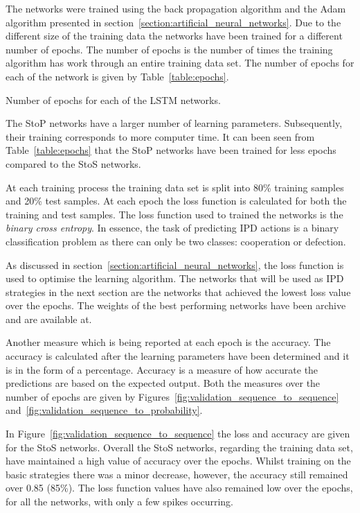 The networks were trained using the back propagation algorithm
and the Adam algorithm presented in
section~\ref{section:artificial_neural_networks}.
Due to the different size of the training data the networks have been trained
for a different number of epochs. The number of epochs is the number of times
the training algorithm has work through an entire training data set. The number
of epochs for each of the \lstmnetworks network is given by
Table~\ref{table:epochs}.

\begin{table}[!htbp]
    \begin{center}
    \resizebox{.9\textwidth}{!}{
        
    }
\end{center}
\caption{Number of epochs for each of the LSTM networks.}\label{table:epochs}
\end{table}

The StoP networks have a larger number of learning parameters. Subsequently,
their training corresponds to more computer time. It can been seen from
Table~\ref{table:epochs} that the StoP networks have been trained for less
epochs compared to the StoS networks.

At each training process the training data set is split into 80\% training samples
and 20\% test samples. At each epoch the loss function is calculated for both
the training and test samples. The loss function used to trained the networks
is the \textit{binary cross entropy}. In essence, the task of predicting IPD
actions is a binary classification problem as there can only be two classes:
cooperation or defection.

As discussed in section~\ref{section:artificial_neural_networks}, the loss
function is used to optimise the learning algorithm. The networks that will
be used as IPD strategies in the next section are the networks that achieved
the lowest loss value over the epochs. The weights of the best performing
networks have been archive and are available at. %

Another measure which is being reported at each epoch is the accuracy. The accuracy
is calculated after the learning parameters have been determined and it is in
the form of a percentage. Accuracy is a measure of how accurate the predictions
are based on the expected output. Both the measures over the number of epochs
are given by Figures~\ref{fig:validation_sequence_to_sequence}
and~\ref{fig:validation_sequence_to_probability}.

In Figure~\ref{fig:validation_sequence_to_sequence} the loss and accuracy are
given for the StoS networks. Overall the StoS networks, regarding the training
data set, have maintained a high value of accuracy over the epochs. Whilst
training on the basic strategies there was a minor decrease, however, the
accuracy still remained over 0.85 (85\%). The loss function values have also
remained low over the epochs, for all the networks, with only a few spikes
occurring.

